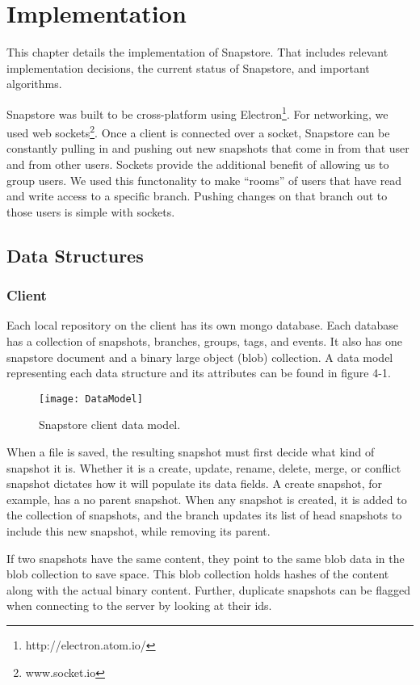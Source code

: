 \chapter{Implementation}

This chapter details the implementation of Snapstore. That includes relevant implementation decisions, the current status of Snapstore, and important algorithms. 

Snapstore was built to be cross-platform using Electron\footnote{http://electron.atom.io/}. For networking, we used web sockets\footnote{www.socket.io}. Once a client is connected over a socket, Snapstore can be constantly pulling in and pushing out new snapshots that come in from that user and from other users. Sockets provide the additional benefit of allowing us to group users. We used this functonality to make ``rooms'' of users that have read and write access to a specific branch. Pushing changes on that branch out to those users is simple with sockets.

\section{Data Structures}

\subsection{Client}

Each local repository on the client has its own mongo database. Each database has a collection of snapshots, branches, groups, tags, and events. It also has one snapstore document and a binary large object (blob) collection. A data model representing each data structure and its attributes can be found in figure 4-1.

\begin{figure}
\texttt{[image: DataModel]}
\caption{Snapstore client data model.}
\label{arm:fig1}
\end{figure}

When a file is saved, the resulting snapshot must first decide what kind of snapshot it is. Whether it is a create, update, rename, delete, merge, or conflict snapshot dictates how it will populate its data fields. A create snapshot, for example, has a no parent snapshot. When any snapshot is created, it is added to the collection of snapshots, and the branch updates its list of head snapshots to include this new snapshot, while removing its parent.

If two snapshots have the same content, they point to the same blob data in the blob collection to save space. This blob collection holds hashes of the content along with the actual binary content. Further, duplicate snapshots can be flagged when connecting to the server by looking at their ids.

